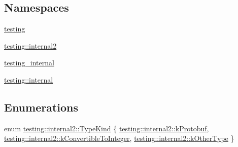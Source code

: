 \subsection*{Namespaces}
\begin{DoxyCompactItemize}
\item 
 \hyperlink{namespacetesting}{testing}
\item 
 \hyperlink{namespacetesting_1_1internal2}{testing\+::internal2}
\item 
 \hyperlink{namespacetesting__internal}{testing\+\_\+internal}
\item 
 \hyperlink{namespacetesting_1_1internal}{testing\+::internal}
\end{DoxyCompactItemize}
\subsection*{Enumerations}
\begin{DoxyCompactItemize}
\item 
enum \hyperlink{namespacetesting_1_1internal2_aeb8161b0b3ee503347b0662d7028fd57}{testing\+::internal2\+::\+Type\+Kind} \{ \hyperlink{namespacetesting_1_1internal2_aeb8161b0b3ee503347b0662d7028fd57a14aaf98a2547ecf43eef0868d54b1383}{testing\+::internal2\+::k\+Protobuf}, 
\hyperlink{namespacetesting_1_1internal2_aeb8161b0b3ee503347b0662d7028fd57a9bdcf3f1548f498b2b7f097306ea0224}{testing\+::internal2\+::k\+Convertible\+To\+Integer}, 
\hyperlink{namespacetesting_1_1internal2_aeb8161b0b3ee503347b0662d7028fd57abe8aaea44751d6ebd0cdf5bd94451db1}{testing\+::internal2\+::k\+Other\+Type}
 \}
\end{DoxyCompactItemize}
